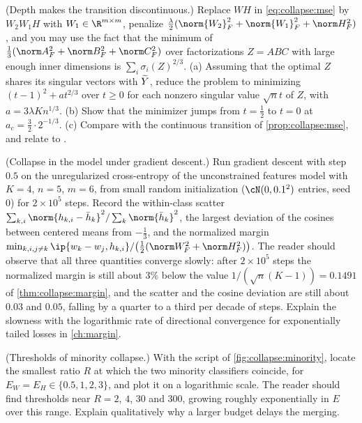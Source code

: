 \begin{refsection}
\begin{exercises}
\item \variation\harder (Depth makes the transition discontinuous.) Replace $WH$ in \eqref{eq:collapse:mse} by $W_2W_1H$ with $W_1\in\R^{m\times m}$, penalize $\frac\lambda2(\norm{W_2}_F^2+\norm{W_1}_F^2+\norm H_F^2)$, and you may use the fact that the minimum of $\frac13(\norm A_F^2+\norm B_F^2+\norm C_F^2)$ over factorizations $Z=ABC$ with large enough inner dimensions is $\sum_i\sigma_i(Z)^{2/3}$. (a) Assuming that the optimal $Z$ shares its singular vectors with $\widetilde Y$, reduce the problem to minimizing $(t-1)^2+at^{2/3}$ over $t\ge0$ for each nonzero singular value $\sqrt nt$ of $Z$, with $a=3\lambda Kn^{1/3}$. (b) Show that the minimizer jumps from $t=\frac12$ to $t=0$ at $a_c=\frac32\cdot2^{-1/3}$. (c) Compare with the continuous transition of \cref{prop:collapse:mse}, and relate to \textcite{SukenikLampertMondelli2024}. \label{ex:collapse:deep}

\item \simulation (Collapse in the model under gradient descent.) Run gradient descent with step $0.5$ on the unregularized cross-entropy of the unconstrained features model with $K=4$, $n=5$, $m=6$, from small random initialization ($\cN(0,0.1^2)$ entries, seed $0$) for $2\times10^5$ steps. Record the within-class scatter $\sum_{k,i}\norm{h_{k,i}-\bar h_k}^2/\sum_k\norm{\bar h_k}^2$, the largest deviation of the cosines between centered means from $-\frac13$, and the normalized margin $\min_{k,i,j\ne k}\ip{w_k-w_j,h_{k,i}}/\bigl(\frac12(\norm W_F^2+\norm H_F^2)\bigr)$. The reader should observe that all three quantities converge slowly: after $2\times10^5$ steps the normalized margin is still about $3\%$ below the value $1/(\sqrt n(K-1))=0.1491$ of \cref{thm:collapse:margin}, and the scatter and the cosine deviation are still about $0.03$ and $0.05$, falling by a quarter to a third per decade of steps. Explain the slowness with the logarithmic rate of directional convergence for exponentially tailed losses in \cref{ch:margin}. \label{ex:collapse:gdsim}

\item \simulation (Thresholds of minority collapse.) With the script of \cref{fig:collapse:minority}, locate the smallest ratio $R$ at which the two minority classifiers coincide, for $E_W=E_H\in\{0.5,1,2,3\}$, and plot it on a logarithmic scale. The reader should find thresholds near $R=2$, $4$, $30$ and $300$, growing roughly exponentially in $E$ over this range. Explain qualitatively why a larger budget delays the merging. \label{ex:collapse:threshold}


\end{exercises}
\end{refsection}
